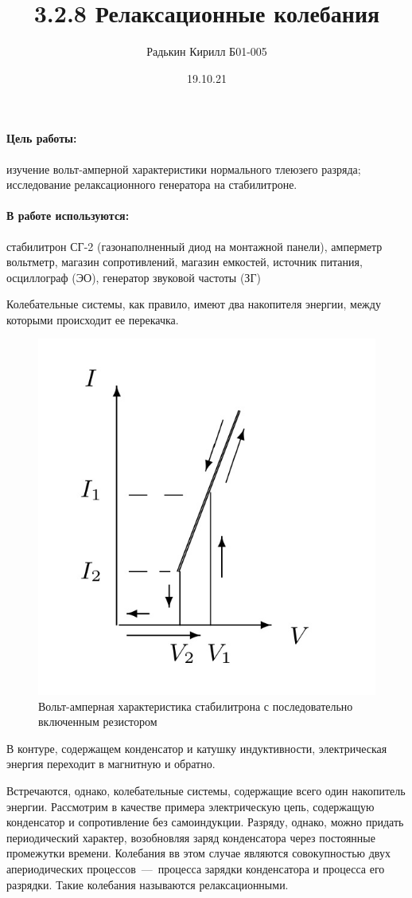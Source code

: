 \documentclass[a4paper, 12pt]{article}
\author{Радькин Кирилл Б01-005}
\title{3.2.8 Релаксационные колебания}
\date{19.10.21}
\newcommand{\parag}[1]{\paragraph*{#1:}}
\begin{document}
    \maketitle

    \parag{Цель работы} изучение вольт-амперной характеристики нормального тлеюзего разряда; исследование релаксационного генератора на стабилитроне.

    \parag{В работе используются} стабилитрон СГ-2 (газонаполненный диод на монтажной панели), амперметр вольтметр, магазин сопротивлений, магазин емкостей, источник питания, осциллограф (ЭО), генератор звуковой частоты (ЗГ) \newline

    Колебательные системы, как правило, имеют два накопителя энергии, между которыми происходит ее перекачка.

    \begin{figure}
        \includegraphics[scale=0.2]{pic1.jpg}
        \caption{Вольт-амперная характеристика стабилитрона с последовательно включенным резистором}
    \end{figure}
    В контуре, содержащем конденсатор и катушку индуктивности, электрическая энергия переходит в магнитную и обратно.

    Встречаются, однако, колебательные системы, содержащие всего один накопитель энергии.
    Рассмотрим в качестве примера электрическую цепь, содержащую конденсатор и сопротивление без самоиндукции. 
    Разряду, однако, можно придать периодический характер, возобновляя заряд конденсатора через постоянные промежутки времени. 
    Колебания вв этом случае являются совокупностью двух апериодических процессов~---~процесса зарядки конденсатора и процесса его разрядки. 
    Такие колебания называются релаксационными.
\end{document}
